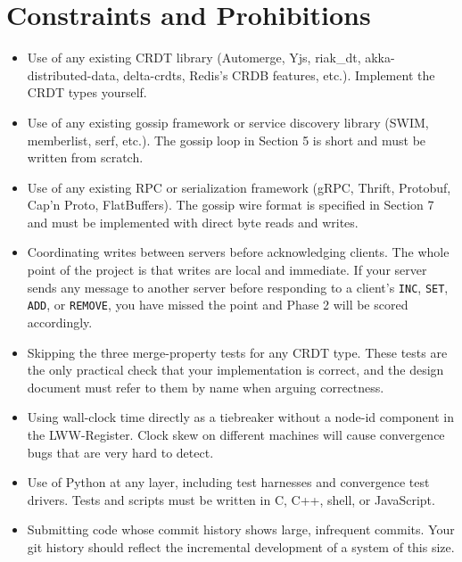 \documentclass[11pt,a4paper]{article}
\begin{document}
\section{Constraints and Prohibitions}

\begin{notebox}
\begin{itemize}
\item Use of any existing CRDT library (Automerge, Yjs, riak\_dt, akka-distributed-data, delta-crdts, Redis's CRDB features, etc.). Implement the CRDT types yourself.

\item Use of any existing gossip framework or service discovery library (SWIM, memberlist, serf, etc.). The gossip loop in Section 5 is short and must be written from scratch.

\item Use of any existing RPC or serialization framework (gRPC, Thrift, Protobuf, Cap'n Proto, FlatBuffers). The gossip wire format is specified in Section 7 and must be implemented with direct byte reads and writes.

\item Coordinating writes between servers before acknowledging clients. The whole point of the project is that writes are local and immediate. If your server sends any message to another server before responding to a client's \texttt{INC}, \texttt{SET}, \texttt{ADD}, or \texttt{REMOVE}, you have missed the point and Phase 2 will be scored accordingly.

\item Skipping the three merge-property tests for any CRDT type. These tests are the only practical check that your implementation is correct, and the design document must refer to them by name when arguing correctness.

\item Using wall-clock time directly as a tiebreaker without a node-id component in the LWW-Register. Clock skew on different machines will cause convergence bugs that are very hard to detect.

\item Use of Python at any layer, including test harnesses and convergence test drivers. Tests and scripts must be written in C, C++, shell, or JavaScript.

\item Submitting code whose commit history shows large, infrequent commits. Your git history should reflect the incremental development of a system of this size.
\end{itemize}
\end{notebox}
\end{document}
